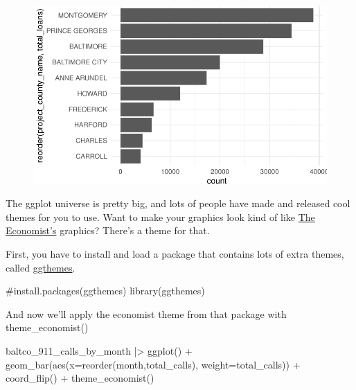 \documentclass[
  letterpaper,
  DIV=11,
  numbers=noendperiod]{scrreprt}
\newenvironment{Shaded}{\begin{snugshade}}{\end{snugshade}}
\newcommand{\AttributeTok}[1]{\textcolor[rgb]{0.40,0.45,0.13}{#1}}
\newcommand{\CommentTok}[1]{\textcolor[rgb]{0.37,0.37,0.37}{#1}}
\newcommand{\FunctionTok}[1]{\textcolor[rgb]{0.28,0.35,0.67}{#1}}
\newcommand{\NormalTok}[1]{\textcolor[rgb]{0.00,0.23,0.31}{#1}}
\newcommand{\SpecialCharTok}[1]{\textcolor[rgb]{0.37,0.37,0.37}{#1}}
\begin{document}
\begin{figure}[H]

{\centering \includegraphics{./visualizing-for-reporting_files/figure-pdf/unnamed-chunk-8-1.pdf}

}

\end{figure}

The ggplot universe is pretty big, and lots of people have made and
released cool themes for you to use. Want to make your graphics look
kind of like \href{https://www.economist.com/}{The Economist's}
graphics? There's a theme for that.

First, you have to install and load a package that contains lots of
extra themes, called
\href{https://yutannihilation.github.io/allYourFigureAreBelongToUs/ggthemes/}{ggthemes}.

\begin{Shaded}
\begin{Highlighting}[]
\CommentTok{\#install.packages(\textquotesingle{}ggthemes\textquotesingle{})}
\FunctionTok{library}\NormalTok{(ggthemes)}
\end{Highlighting}
\end{Shaded}

And now we'll apply the economist theme from that package with
theme\_economist()

\begin{Shaded}
\begin{Highlighting}[]
\NormalTok{baltco\_911\_calls\_by\_month }\SpecialCharTok{|\textgreater{}}
  \FunctionTok{ggplot}\NormalTok{() }\SpecialCharTok{+}
  \FunctionTok{geom\_bar}\NormalTok{(}\FunctionTok{aes}\NormalTok{(}\AttributeTok{x=}\FunctionTok{reorder}\NormalTok{(month,total\_calls), }\AttributeTok{weight=}\NormalTok{total\_calls)) }\SpecialCharTok{+}
  \FunctionTok{coord\_flip}\NormalTok{() }\SpecialCharTok{+} 
  \FunctionTok{theme\_economist}\NormalTok{()}
\end{Highlighting}
\end{Shaded}
\end{document}
